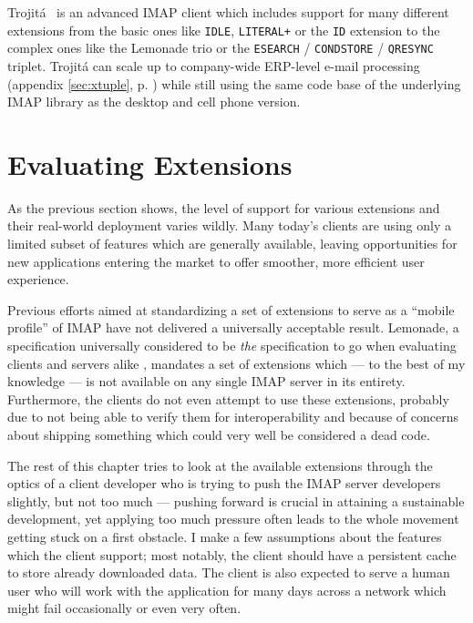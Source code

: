 \documentclass[trojita]{subfiles}
\begin{document}
Trojitá~\cite{trojita-website} is an advanced IMAP client which includes support for many different extensions from the
basic ones like {\tt IDLE}, {\tt LITERAL+} or the {\tt ID} extension to the complex ones like the Lemonade trio or the
{\tt ESEARCH} / {\tt CONDSTORE} / {\tt QRESYNC} triplet.  Trojitá can scale up to company-wide ERP-level e-mail
processing (appendix \ref{sec:xtuple}, p. \pageref{sec:xtuple}) while still using the same code base of
the underlying IMAP library as the desktop and cell phone version.

\section{Evaluating Extensions}

As the previous section shows, the level of support for various extensions and their real-world deployment varies
wildly.  Many today's clients are using only a limited subset of features which are generally available, leaving
opportunities for new applications entering the market to offer smoother, more efficient user experience.

Previous efforts aimed at standardizing a set of extensions to serve as a ``mobile profile'' of IMAP have not delivered
a universally acceptable result.  Lemonade, a specification universally considered to be {\em the} specification to go
when evaluating clients and servers alike \cite{isode-lemonade}, mandates a set of extensions which --- to the best of
my knowledge --- is not available on any single IMAP server in its entirety.  Furthermore, the clients do not even
attempt to use these extensions, probably due to not being able to verify them for interoperability and because of
concerns about shipping something which could very well be considered a dead code.

The rest of this chapter tries to look at the available extensions through the optics of a client developer who is
trying to push the IMAP server developers slightly, but not too much --- pushing forward is crucial in attaining a
sustainable development, yet applying too much pressure often leads to the whole movement getting stuck on a first
obstacle.  I make a few assumptions about the features which the client support; most notably, the client should have a
persistent cache to store already downloaded data.  The client is also expected to serve a human user who will work with
the application for many days across a network which might fail occasionally or even very often.
\end{document}
